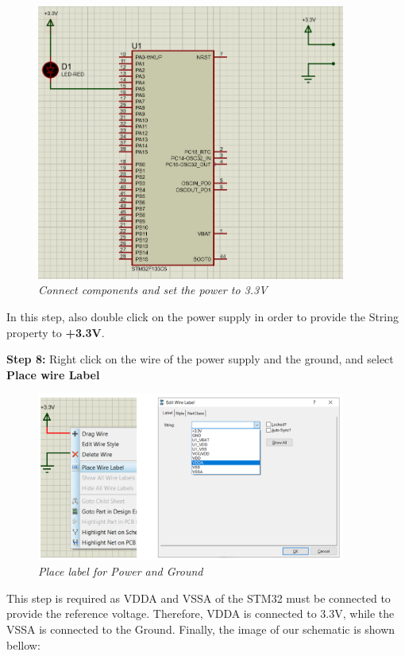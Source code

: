 \begin{figure}[!htp]
    \centering
    \includegraphics[width=4in]{source/picture/bai_1/pic15.PNG}
    \caption{\textit{Connect components and set the power to 3.3V}}
    \label{bai1_pic15}
\end{figure}

In this step, also double click on the power supply in order to provide the String property to \textbf{+3.3V}.

\textbf{Step 8: } Right click on the wire of the power supply and the ground, and select \textbf{Place wire Label}

\begin{figure}[!htp]
    \centering
    \includegraphics[width=4in]{source/picture/bai_1/pic16.PNG}
    \caption{\textit{Place label for Power and Ground}}
    \label{bai1_pic16}
\end{figure}

This step is required as VDDA and VSSA of the STM32 must be connected to provide the reference voltage. Therefore, VDDA is connected to 3.3V, while the VSSA is connected to the Ground. Finally, the image of our schematic is shown bellow:

